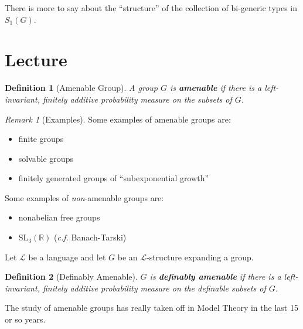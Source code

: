 \documentclass[]{article}
\theoremstyle{custhm}
\theoremstyle{cusdef}
\theoremstyle{custhm}
\theoremstyle{custhm}
\theoremstyle{custhm}
\theoremstyle{ex}
\theoremstyle{custhm}
\theoremstyle{cusdef}
\newtheorem*{defin*}{Definition}
\theoremstyle{remark}
\newtheorem*{remark*}{Remark}
\theoremstyle{remark}
\theoremstyle{numremark}
\newcommand{\R}{\mathbb{R}}
\newcommand{\undf}[1]{\textit{\textbf{#1}}}
\renewcommand{\L}{\mathcal{L}}
\renewcommand{\it}[1]{\textit{#1}}
\begin{document}
There is more to say about the ``structure'' of the collection of bi-generic types in $S_1(G)$.

\section{Lecture}

\begin{defin*}[Amenable Group]
	A group $G$ is \undf{amenable} if there is a left-invariant, finitely additive probability measure on the subsets of $G$.
\end{defin*}
\begin{remark*}[Examples]
	Some examples of amenable groups are:
	\begin{itemize}
		\item finite groups
		\item solvable groups
		\item finitely generated groups of ``subexponential growth''
	\end{itemize}
	Some examples of \it{non}-amenable groups are:
	\begin{itemize}
		\item nonabelian free groups
		\item $\textrm{SL}_3(\R)$ (\it{c.f.} Banach-Tarski)
	\end{itemize}
\end{remark*}

Let $\L$ be a language and let $G$ be an $\L$-structure expanding a group.

\begin{defin*}[Definably Amenable]
	$G$ is \undf{definably amenable} if there is a left-invariant, finitely additive probability measure on the definable subsets of $G$.
\end{defin*}

The study of amenable groups has really taken off in Model Theory in the last 15 or so years.
\end{document}
